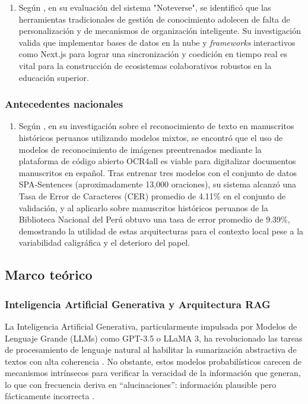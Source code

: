 \begin{enumerate}[label=\alph*)]
\item Según \textcite{Shirkande2025}, en su evaluación del sistema "Noteverse", se identificó que las herramientas tradicionales de gestión de conocimiento adolecen de falta de personalización y de mecanismos de organización inteligente. Su investigación valida que implementar bases de datos en la nube y \textit{frameworks} interactivos como Next.js para lograr una sincronización y coedición en tiempo real es vital para la construcción de ecosistemas colaborativos robustos en la educación superior.
\end{enumerate}

\subsubsection{Antecedentes nacionales}

\begin{enumerate}[label=\alph*)]
\item Según \textcite{TarazonaCruz2024}, en su investigación sobre el reconocimiento de texto en manuscritos históricos peruanos utilizando modelos mixtos, se encontró que el uso de modelos de reconocimiento de imágenes preentrenados mediante la plataforma de código abierto OCR4all es viable para digitalizar documentos manuscritos en español. Tras entrenar tres modelos con el conjunto de datos SPA-Sentences (aproximadamente 13,000 oraciones), su sistema alcanzó una Tasa de Error de Caracteres (CER) promedio de 4.11\% en el conjunto de validación, y al aplicarlo sobre manuscritos históricos peruanos de la Biblioteca Nacional del Perú obtuvo una tasa de error promedio de 9.39\%, demostrando la utilidad de estas arquitecturas para el contexto local pese a la variabilidad caligráfica y el deterioro del papel.
\end{enumerate}

\subsection{Marco teórico}

\subsubsection{Inteligencia Artificial Generativa y Arquitectura RAG}

La Inteligencia Artificial Generativa, particularmente impulsada por Modelos de Lenguaje 
Grande (LLMs) como GPT-3.5 o LLaMA 3, ha revolucionado las tareas de procesamiento de 
lenguaje natural al habilitar la sumarización abstractiva de textos con alta coherencia 
\parencite{Saxena2025}. No obstante, estos modelos probabilísticos carecen de mecanismos 
intrínsecos para verificar la veracidad de la información que generan, lo que con 
frecuencia deriva en ``alucinaciones'': información plausible pero fácticamente incorrecta 
\parencite{Chen2023}.

